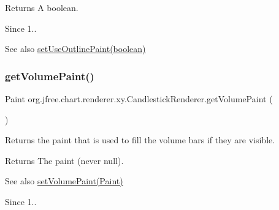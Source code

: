 \begin{DoxyReturn}{Returns}
A boolean.
\end{DoxyReturn}
\begin{DoxySince}{Since}
1..
\end{DoxySince}
\begin{DoxySeeAlso}{See also}
\mbox{\hyperlink{classorg_1_1jfree_1_1chart_1_1renderer_1_1xy_1_1_candlestick_renderer_a36ef8d46b1f8ff99c0a1172e69e591c0}{set\+Use\+Outline\+Paint(boolean)}} 
\end{DoxySeeAlso}
\mbox{\label{classorg_1_1jfree_1_1chart_1_1renderer_1_1xy_1_1_candlestick_renderer_aceacdf4786ea906e937154c46474e117}} 
\subsubsection{\texorpdfstring{get\+Volume\+Paint()}{getVolumePaint()}}
{\footnotesize\ttfamily Paint org.\+jfree.\+chart.\+renderer.\+xy.\+Candlestick\+Renderer.\+get\+Volume\+Paint (\begin{DoxyParamCaption}{ }\end{DoxyParamCaption})}

Returns the paint that is used to fill the volume bars if they are visible.

\begin{DoxyReturn}{Returns}
The paint (never {\ttfamily null}).
\end{DoxyReturn}
\begin{DoxySeeAlso}{See also}
\mbox{\hyperlink{classorg_1_1jfree_1_1chart_1_1renderer_1_1xy_1_1_candlestick_renderer_ae38a9367abdb25199c31357fe5a43f9d}{set\+Volume\+Paint(\+Paint)}}
\end{DoxySeeAlso}
\begin{DoxySince}{Since}
1.. 
\end{DoxySince}
\mbox{\label{classorg_1_1jfree_1_1chart_1_1renderer_1_1xy_1_1_candlestick_renderer_a118db6811e46c6dc47ad83d25cf6773c}} 
